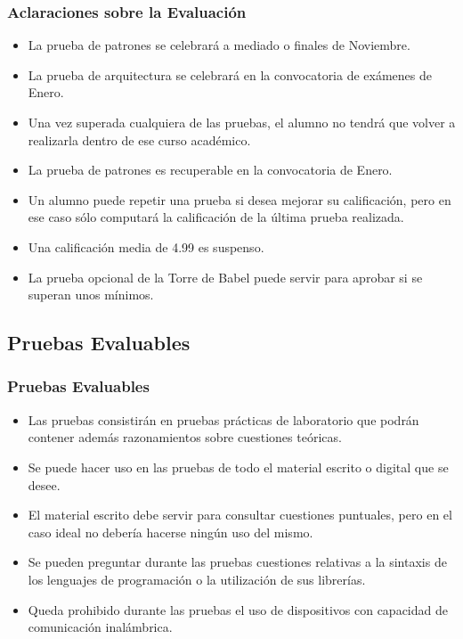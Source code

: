 \documentclass[animated,a4paper,slidestop,xcolor=pst,blue]{beamer}
\begin{document}
\begin{frame}[c]
	\frametitle{Aclaraciones sobre la Evaluación}
	\begin{itemize}
        \item<2-> La prueba de patrones se celebrará a mediado o finales de Noviembre.
        \item<3-> La prueba de arquitectura se celebrará en la convocatoria de exámenes de Enero.
        \item<5-> Una vez superada cualquiera de las pruebas, el alumno no tendrá que volver a realizarla dentro de ese curso académico.
        \item<5-> La prueba de patrones es recuperable en la convocatoria de Enero.
        \item<6-> Un alumno puede repetir una prueba si desea mejorar su calificación, pero en ese caso sólo computará la calificación de la última prueba realizada.
		\item<7-> Una calificación media de 4.99 es suspenso.
        \item<8-> La prueba opcional de la Torre de Babel puede servir para aprobar si se superan unos mínimos.
	\end{itemize}
\end{frame}

\subsection{Pruebas Evaluables}

\begin{frame}[c]
    \frametitle{Pruebas Evaluables}
	\begin{itemize}[<+->]
	   \item Las pruebas consistirán en pruebas prácticas de laboratorio que podrán contener además razonamientos sobre cuestiones teóricas.
       \item Se puede hacer uso en las pruebas de todo el material escrito o digital que se desee.
       \item El material escrito debe servir para consultar cuestiones puntuales, pero en el caso ideal no debería hacerse ningún uso del mismo.
       \item Se pueden preguntar durante las pruebas cuestiones relativas a la sintaxis de los lenguajes de programación o la utilización de sus librerías.
       \item Queda prohibido durante las pruebas el uso de dispositivos con capacidad de comunicación inalámbrica.
	\end{itemize}
\end{frame}
\end{document}
